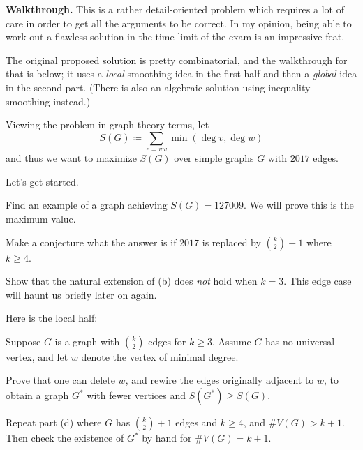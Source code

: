 \documentclass[11pt]{scrartcl}
\providecommand{\ii}{\item}
\newenvironment{walkthrough}{\noindent\textbf{\color{green!40!black}Walkthrough.}}{}
\begin{document}
\begin{walkthrough}
This is a rather detail-oriented problem which requires a lot of care
in order to get all the arguments to be correct.
In my opinion, being able to work out a flawless solution
in the time limit of the exam is an impressive feat.

The original proposed solution is pretty combinatorial,
and the walkthrough for that is below;
it uses a \emph{local} smoothing idea in the first half
and then a \emph{global} idea in the second part.
(There is also an algebraic solution using
inequality smoothing instead.)

Viewing the problem in graph theory terms,
let \[ S(G) \coloneqq \sum_{e = vw} \min \left( \deg v, \deg w \right) \]
and thus we want to maximize $S(G)$ over simple graphs $G$ with $2017$ edges.

Let's get started.
\begin{walk}
  \ii Find an example of a graph achieving $S(G) = 127009$.
  We will prove this is the maximum value.

  \ii Make a conjecture what the answer is if $2017$
  is replaced by $\binom k2+1$ where $k \ge 4$.

  \ii Show that the natural extension of (b) does \emph{not} hold when $k = 3$.
  This edge case will haunt us briefly later on again.
\end{walk}
Here is the local half:
\begin{walk}[resume]
  \ii Suppose $G$ is a graph with $\binom k2$ edges for $k \ge 3$.
  Assume $G$ has no universal vertex,
  and let $w$ denote the vertex of minimal degree.

  Prove that one can delete $w$, and rewire the edges originally adjacent to $w$,
  to obtain a graph $G^\ast$ with fewer vertices and $S(G^\ast) \ge S(G)$.

  \ii Repeat part (d) where $G$ has $\binom k2 + 1$ edges
  and $k \ge 4$, and $\#V(G) > k+1$.
  Then check the existence of $G^\ast$ by hand for $\#V(G) = k+1$.


\end{walk}
\end{walkthrough}
\end{document}
